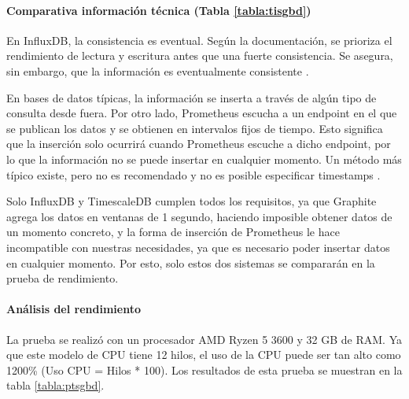 \paragraph*{Comparativa información técnica (Tabla \ref*{tabla:tisgbd})} En InfluxDB, la consistencia es eventual. Según
la documentación, se prioriza el rendimiento de lectura y escritura antes que una fuerte consistencia. Se asegura, sin 
embargo, que la información es eventualmente consistente \cite{influx:consistency}.

En bases de datos típicas, la información se inserta a través de algún tipo de consulta desde fuera. Por otro lado, 
Prometheus escucha a un endpoint en el que se publican los datos y se obtienen en intervalos fijos de tiempo. Esto 
significa que la inserción solo ocurrirá cuando Prometheus escuche a dicho endpoint, por lo que la información no se 
puede insertar en cualquier momento. Un método más típico existe, pero no es recomendado y no es posible especificar 
timestamps \cite{prom:pushgateway}.

Solo InfluxDB y TimescaleDB cumplen todos los requisitos, ya que Graphite agrega los datos en ventanas de 1 segundo,
haciendo imposible obtener datos de un momento concreto, y la forma de inserción de Prometheus le hace incompatible 
con nuestras necesidades, ya que es necesario poder insertar datos en cualquier momento. Por esto, solo estos dos
sistemas se compararán en la prueba de rendimiento.

\paragraph*{Análisis del rendimiento} La prueba se realizó con un procesador AMD Ryzen 5 3600 y 32 GB de RAM. Ya que 
este modelo de CPU tiene 12 hilos, el uso de la CPU puede ser tan alto como 1200\% (Uso CPU = Hilos * 100). Los resultados
de esta prueba se muestran en la tabla \ref*{tabla:ptsgbd}.


